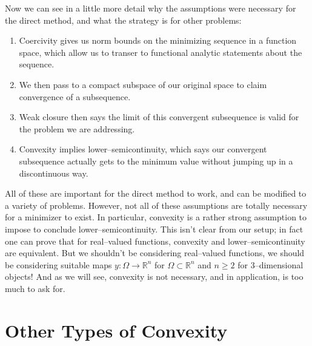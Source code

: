 \documentclass[../main.tex]{subfiles}
\begin{document}
Now we can see in a little more detail why the assumptions were necessary for the direct method, and what the strategy is for other problems:

\begin{enumerate}
\item Coercivity gives us norm bounds on the minimizing sequence in a function space, which allow us to transer to functional analytic statements about the sequence.
\item We then pass to a compact subspace of our original space to claim convergence of a subsequence.
\item Weak closure then says the limit of this convergent subsequence is valid for the problem we are addressing.
\item Convexity implies lower--semicontinuity, which says our convergent subsequence actually gets to the minimum value without jumping up in a discontinuous way.
\end{enumerate}


All of these are important for the direct method to work, and can be modified to a variety of problems.
However, not all of these assumptions are totally necessary for a minimizer to exist.
In particular, convexity is a rather strong assumption to impose to conclude lower--semicontinuity.
This isn't clear from our setup; in fact one can prove that for real--valued functions, convexity and lower--semicontinuity are equivalent.
But we shouldn't be considering real--valued functions, we should be considering suitable maps $y: \Omega \to \mathbb{R}^n$ for $\Omega \subset \mathbb{R}^n$ and $n \geq 2$ for 3--dimensional objects!
And as we will see, convexity is not necessary, and in application, is too much to ask for.

\section{Other Types of Convexity}








\printbibliography
\end{document}
